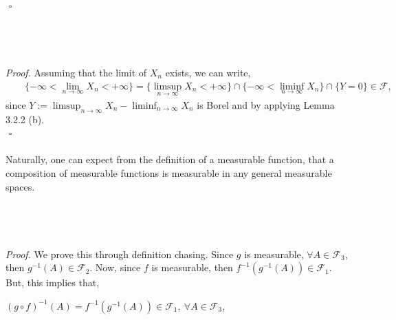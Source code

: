 \documentclass{article}
\begin{document}
${}$ \hfill $\square$ \\\\
\noindent{}\\\\\\
\textit{Proof.} Assuming that the limit of $X_n$ exists, we can write,
\begin{eqnarray}
\nonumber
&&\{-\infty < \lim_{n\to\infty}X_n < +\infty\} = \{\limsup_{n\to\infty}X_n < +\infty\} \cap \{-\infty < \liminf_{n\to\infty}X_n\} \cap \{Y = 0\} \in \mathcal{F},
\end{eqnarray}
since $Y := \limsup_{n\to\infty}X_n - \liminf_{n\to\infty}X_n$ is Borel and by applying Lemma 3.2.2 (b). \\ ${}$ \hfill $\square$ \\\\
Naturally, one can expect from the definition of a measurable function, that a composition of measurable functions is measurable in any general measurable spaces.\\\\
\noindent{}\\\\\\
\textit{Proof.} We prove this through definition chasing. Since $g$ is measurable, $\forall A \in \mathcal{F}_3$, then $g^{-1}(A) \in \mathcal{F}_2$. Now, since $f$ is measurable, then $f^{-1}(g^{-1}(A)) \in \mathcal{F}_1$. But, this implies that,
\begin{center}
	$(g \circ f)^{-1}(A) = f^{-1}(g^{-1}(A)) \in \mathcal{F}_1, \ \forall A \in \mathcal{F}_3$,
\end{center}
\end{document}
